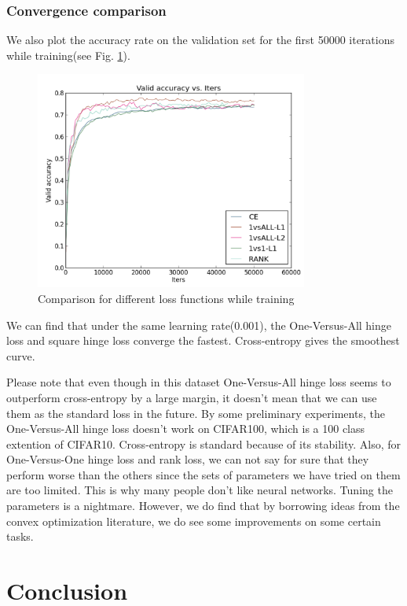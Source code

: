 \documentclass{article} %
\begin{document}
\subsubsection{Convergence comparison}
We also plot the accuracy rate on the validation set for the first 50000 iterations while training(see Fig. \ref{conv}).
\begin{figure}
\centering 
\includegraphics[width=0.8\textwidth]{plot_cnn.png}
\caption{Comparison for different loss functions while training}
\label{conv} 
\end{figure}
We can find that under the same learning rate(0.001), the One-Versus-All hinge loss and square hinge loss converge the fastest. Cross-entropy gives the smoothest curve.


Please note that even though in this dataset One-Versus-All hinge loss seems to outperform cross-entropy by a large margin, it doesn't mean that we can use them as the standard loss in the future. By some preliminary experiments, the One-Versus-All hinge loss doesn't work on CIFAR100, which is a 100 class extention of CIFAR10. Cross-entropy is standard because of its stability. Also, for One-Versus-One hinge loss and rank loss, we can not say for sure that they perform worse than
the others since the sets of parameters we have tried on them are too limited. This is why many people don't like neural networks. Tuning the parameters is a nightmare. However, we do find that by borrowing ideas from the convex optimization literature, we do see some improvements on some certain tasks. 



\section{Conclusion}



\end{document}
